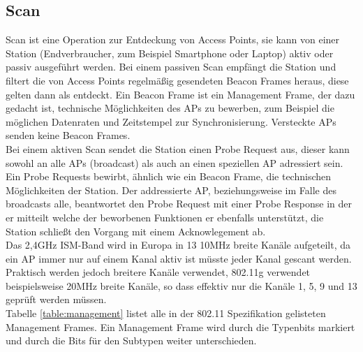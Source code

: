 \subsection{Scan}
Scan ist eine Operation zur Entdeckung von Access Points, sie kann von einer Station (Endverbraucher, zum Beispiel Smartphone oder Laptop) aktiv oder passiv ausgeführt werden.
Bei einem passiven Scan empfängt die Station und filtert die von Access Points regelmäßig gesendeten Beacon Frames heraus, diese gelten dann als entdeckt.
Ein Beacon Frame ist ein Management Frame, der dazu gedacht ist, technische Möglichkeiten des APs zu bewerben, zum Beispiel die möglichen Datenraten und Zeitstempel zur Synchronisierung.
Versteckte APs senden keine Beacon Frames. \\
Bei einem aktiven Scan sendet die Station einen Probe Request aus, dieser kann sowohl an alle APs (broadcast) als auch an einen speziellen AP adressiert sein.
Ein Probe Requests bewirbt, ähnlich wie ein Beacon Frame, die technischen Möglichkeiten der Station.
Der addressierte AP, beziehungsweise im Falle des broadcasts alle, beantwortet den Probe Request mit einer Probe Response in der er mitteilt welche der beworbenen Funktionen er ebenfalls unterstützt, die Station schließt den Vorgang mit einem Acknowlegement ab. \\
Das 2,4GHz ISM-Band wird in Europa in 13 10MHz breite Kanäle aufgeteilt, da ein AP immer nur auf einem Kanal aktiv ist müsste jeder Kanal gescant werden.
Praktisch werden jedoch breitere Kanäle verwendet, 802.11g verwendet beispielsweise 20MHz breite Kanäle, so dass effektiv nur die Kanäle 1, 5, 9 und 13 geprüft werden müssen. \\
Tabelle \ref{table:management} listet alle in der 802.11 Spezifikation gelisteten Management Frames.
Ein Management Frame wird durch die Typenbits markiert und durch die Bits für den Subtypen weiter unterschieden.


